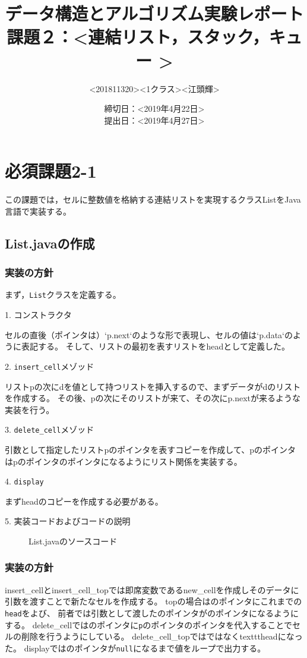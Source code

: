 \documentclass[10.5pt,a4paper]{jsarticle}
\title{データ構造とアルゴリズム実験レポート\\課題２：\textless 連結リスト，スタック，キュー \textgreater}
\author{\textless 201811320\textgreater \textless 1クラス\textgreater \textless 江頭輝\textgreater}
\date{締切日：\textless 2019年4月22日\textgreater\\提出日：\textless 2019年4月27日\textgreater}
\begin{document}
\maketitle

\section{必須課題2-1}

この課題では，セルに整数値を格納する連結リストを実現するクラスListをJava言語で実装する。

\subsection{List.javaの作成}
\subsubsection{実装の方針}

まず，\texttt{List}クラスを定義する。

1. コンストラクタ

セルの直後（ポインタは）`p.next`のような形で表現し、セルの値は`p.data`のように表記する。
そして、リストの最初を表すリストをheadとして定義した。

2. \texttt{insert\_cell}メゾッド

リストpの次にdを値として持つリストを挿入するので、まずデータがdのリストを作成する。
その後、pの次にそのリストが来て、その次にp.nextが来るような実装を行う。

3. \texttt{delete\_cell}メゾッド

引数として指定したリストpのポインタを表すコピーを作成して、pのポインタはpのポインタのポインタになるようにリスト関係を実装する。

4. \texttt{display}

まずheadのコピーを作成する必要がある。

5. 実装コードおよびコードの説明

\begin{figure}[t]
  \begin{center}
   
   \caption{List.javaのソースコード}
  \end{center}
\end{figure}

\subsubsection{実装の方針}
insert\_cellとinsert\_cell\_topでは即席変数であるnew\_cellを作成しそのデータに引数を渡すことで新たなセルを作成する。
topの場合はのポインタにこれまでの\texttt{head}をよび、
前者では引数として渡したのポインタがのポインタになるようにする。
delete\_cellではのポインタに\texttt{p}のポインタのポインタを代入することでセルの削除を行うようにしている。
delete\_cell\_topではではなくtexttt{head}になった。
displayではのポインタが\texttt{null}になるまで値をループで出力する。
\end{document}
